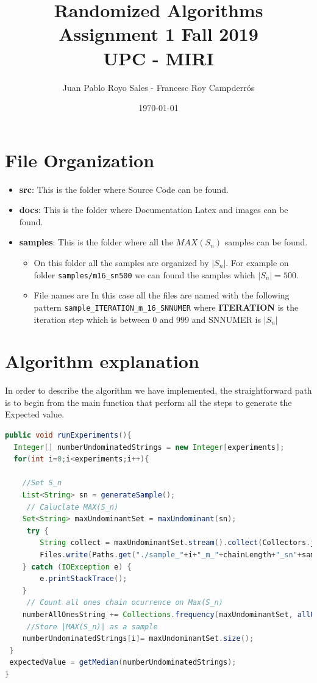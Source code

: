 \documentclass[12pt, a4paper]{article}
\title{
  Randomized Algorithms\\
  Assignment 1 Fall 2019\\
  UPC - MIRI
}
\author{Juan Pablo Royo Sales - Francesc Roy Campderrós}
\date\today
\begin{document}
\begin{titlingpage}
  \maketitle
\end{titlingpage}

\section{File Organization}

\begin{itemize}
\item \textbf{src}: This is the folder where Source Code can be found.
\item \textbf{docs}: This is the folder where Documentation Latex and images
    can be found.
\item \textbf{samples}: This is the folder where all the $MAX(S_n)$ samples can
  be found.
  \begin{itemize}
    \item On this folder all the samples are organized by $|S_n|$. For
  example on folder \lstinline|samples/m16_sn500| we can found the samples which
  $|S_n| = 500$.
    \item File names are In this case all the files are named with the following
      pattern \lstinline|sample_ITERATION_m_16_SNNUMER| where \textbf{ITERATION}
      is the iteration step which is between 0 and 999 and SNNUMER is $|S_n|$
  \end{itemize}
\end{itemize}

\section{Algorithm explanation}

In order to describe the algorithm we have implemented, the straightforward path
is to begin from the main function that perform all the steps to generate the
Expected value.

\begin{lstlisting}[language=Java,caption={runExperiments function},label={fn:runexp}]
public void runExperiments(){
  Integer[] numberUndominatedStrings = new Integer[experiments];
  for(int i=0;i<experiments;i++){
            
    //Set S_n
    List<String> sn = generateSample();
     // Caluclate MAX(S_n)
    Set<String> maxUndominantSet = maxUndominant(sn);
     try {
        String collect = maxUndominantSet.stream().collect(Collectors.joining("\n"));
        Files.write(Paths.get("./sample_"+i+"_m_"+chainLength+"_sn"+samples+".txt"), collect.getBytes());
    } catch (IOException e) {
        e.printStackTrace();
    }
     // Count all ones chain ocurrence on Max(S_n)
    numberAllOnesString += Collections.frequency(maxUndominantSet, allOnes());
     //Store |MAX(S_n)| as a sample
    numberUndominatedStrings[i]= maxUndominantSet.size();
 }
 expectedValue = getMedian(numberUndominatedStrings);
}
\end{lstlisting}
\end{document}
